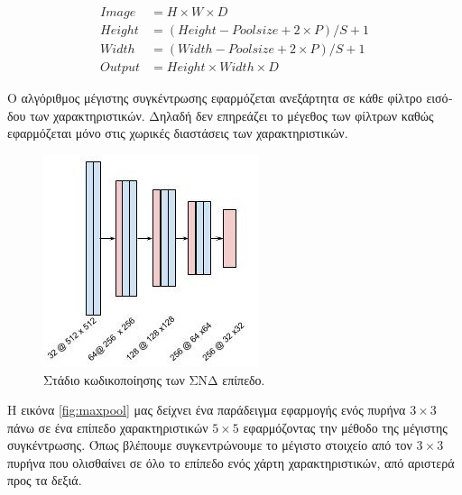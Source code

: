 \begin{equation}
  \label{eqn:maxpool}
  \begin{align*}
  Image &= H\times W \times D\\
  Height &= (Height - Pool size +2\times P)/S + 1\\
  Width &= (Width - Pool size +2\times P)/S + 1\\
  Output &= Height \times Width \times D
  \end{align*}
\end{equation}

\textgreek{Ο αλγόριθμος μέγιστης συγκέντρωσης εφαρμόζεται ανεξάρτητα σε κάθε φίλτρο εισόδου των χαρακτηριστικών. Δηλαδή δεν επηρεάζει το μέγεθος των φίλτρων καθώς εφαρμόζεται μόνο στις χωρικές διαστάσεις των χαρακτηριστικών.} 


\begin{figure}[H]
 \centering
 \includegraphics[scale=0.6]{Images/conv_enc}
  \caption[\textgreek{Στάδιο Κωδικοποίησης}]{\textgreek{Στάδιο κωδικοποίησης των ΣΝΔ} \textgreek{επίπεδο.}}
 \label{fig:encode_stage}
\end{figure}

\textgreek{Η εικόνα }\ref{fig:maxpool} \textgreek{μας δείχνει ένα παράδειγμα εφαρμογής ενός πυρήνα $3\times3$ πάνω σε ένα επίπεδο χαρακτηριστικών $5\times5$ εφαρμόζοντας την μέθοδο της μέγιστης συγκέντρωσης. Όπως βλέπουμε συγκεντρώνουμε το μέγιστο στοιχείο από τον $3\times3$ πυρήνα που ολισθαίνει σε όλο το επίπεδο ενός χάρτη χαρακτηριστικών, από αριστερά προς τα δεξιά.}

